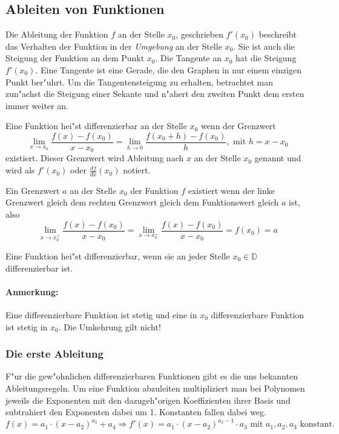 \subsection{Ableiten von Funktionen}
Die Ableitung der Funktion $f$ an der Stelle $x_0$, geschrieben $f'(x_0)$ beschreibt das Verhalten der Funktion in der \textit{Umgebung} an der Stelle $x_0$. Sie ist auch die Steigung der Funktion an dem Punkt $x_0$. Die Tangente an $x_0$ hat die Steigung $f'(x_0)$. Eine Tangente ist eine Gerade, die den Graphen in nur einem einzigen Punkt ber"uhrt. Um die Tangentensteigung zu erhalten, betrachtet man zun"achst die Steigung einer Sekante und n"ahert den zweiten Punkt dem ersten immer weiter an.
\begin{definition}[Differenzierbarkeit in $x_0$]
Eine Funktion hei"st differenzierbar an der Stelle $x_0$ wenn der Grenzwert
\begin{equation*}
 \lim\limits_{x \to x_0} \frac{f(x)-f(x_0)}{x-x_0} = \lim\limits_{h \to 0}  \frac{f(x_0 + h)-f(x_0)}{h} , \text{ mit } h = x - x_0
\end{equation*}
existiert. Dieser Grenzwert wird Ableitung nach $x$ an der Stelle $x_0$ genannt und wird als $f'(x_0)$ oder $\frac{df}{dx}(x_0)$ notiert.
\end{definition}
Ein Grenzwert $a$ an der Stelle $x_0$ der Funktion $f$ existiert wenn der linke Grenzwert gleich dem rechten Grenzwert gleich dem Funktionswert gleich $a$ ist, also
\begin{equation*}
 \lim\limits_{x \to x_0^+} \frac{f(x)-f(x_0)}{x-x_0} =  \lim\limits_{x \to x_0^-} \frac{f(x)-f(x_0)}{x-x_0} = f(x_0) = a
\end{equation*}

\begin{definition}[Differenzierbarkeit]
Eine Funktion hei"st differenzierbar, wenn sie an jeder Stelle $x_0 \in \mathbb{D}$ differenzierbar ist.
\end{definition}

\paragraph{Anmerkung:} Eine differenzierbare Funktion ist stetig und eine in $x_0$ differenzierbare Funktion ist stetig in $x_0$. Die Umkehrung gilt nicht!

\subsubsection{Die erste Ableitung}
F"ur die gew"ohnlichen differenzierbaren Funktionen gibt es die uns bekannten Ableitungsregeln. Um eine Funktion abzuleiten multipliziert man bei Polynomen jeweils die Exponenten mit den dazugeh"origen Koeffizienten ihrer Basis und subtrahiert den Exponenten dabei um 1. Konstanten fallen dabei weg.
\begin{equation*}
f(x) = a_1 \cdot (x-a_2)^{a_3} + a_4 \Rightarrow f'(x) = a_1 \cdot (x - a_2)^{a_3-1} \cdot a_3 \text{ mit } a_1,a_2,a_3 \text{ konstant.}
\end{equation*}

